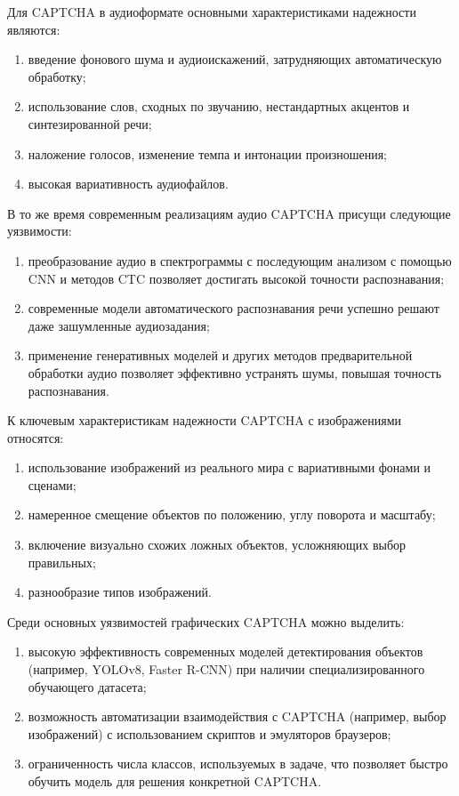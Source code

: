 Для CAPTCHA в аудиоформате основными характеристиками надежности являются:

\begin{enumerate}
    \item введение фонового шума и аудиоискажений, затрудняющих автоматическую 
    обработку;
    \item использование слов, сходных по звучанию, нестандартных акцентов и 
    синтезированной речи;
    \item наложение голосов, изменение темпа и интонации произношения;
    \item высокая вариативность аудиофайлов.
\end{enumerate}

В то же время современным реализациям аудио CAPTCHA присущи следующие уязвимости:

\begin{enumerate}
    \item преобразование аудио в спектрограммы с последующим анализом с помощью 
    CNN и методов CTC позволяет достигать высокой точности распознавания;
    \item современные модели автоматического распознавания речи успешно решают 
    даже зашумленные аудиозадания;
    \item применение генеративных моделей и других методов предварительной 
    обработки аудио позволяет эффективно устранять шумы, повышая точность 
    распознавания.
\end{enumerate}

К ключевым характеристикам надежности CAPTCHA с изображениями относятся:

\begin{enumerate}
    \item использование изображений из реального мира с вариативными фонами и 
    сценами;
    \item намеренное смещение объектов по положению, углу поворота и масштабу;
    \item включение визуально схожих ложных объектов, усложняющих выбор 
    правильных;
    \item разнообразие типов изображений.
\end{enumerate}

Среди основных уязвимостей графических CAPTCHA можно выделить:

\begin{enumerate}
    \item высокую эффективность современных моделей детектирования объектов 
    (например, YOLOv8, Faster R-CNN) при наличии специализированного обучающего 
    датасета;
    \item возможность автоматизации взаимодействия с CAPTCHA (например, выбор 
    изображений) с использованием скриптов и эмуляторов браузеров;
    \item ограниченность числа классов, используемых в задаче, что позволяет 
    быстро обучить модель для решения конкретной CAPTCHA.
\end{enumerate}
